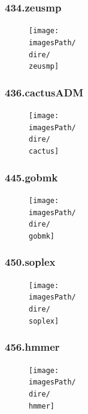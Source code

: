 \documentclass[12pt,a4paper]{article}
\newcommand{\imagesPath}{/home/nick/arch-ntua/ex02/graphs}
\newcommand{\zeusmp}{434.zeusmp.cslab_branch_predictors.out.pdf}
\newcommand{\cactus}{436.cactusADM.cslab_branch_predictors.out.pdf}
\newcommand{\gobmk}{445.gobmk.cslab_branch_predictors.out.pdf}
\newcommand{\soplex}{450.soplex.cslab_branch_predictors.out.pdf}
\newcommand{\hmmer}{456.hmmer.cslab_branch_predictors.out.pdf}
\newcommand{\dire}{4.5}
\begin{document}
		\subsubsection{434.zeusmp}
			\begin{figure}[H]
				\begin{center}
					 \texttt{[image: \\imagesPath/\\dire/\\zeusmp]}
				\end{center}
			\end{figure}
		
		\subsubsection{436.cactusADM}
			\begin{figure}[H]
				\begin{center}
					 \texttt{[image: \\imagesPath/\\dire/\\cactus]}
				\end{center}
			\end{figure}
		
		\subsubsection{445.gobmk}
			\begin{figure}[H]
				\begin{center}
					 \texttt{[image: \\imagesPath/\\dire/\\gobmk]}
				\end{center}
			\end{figure}
		
		\subsubsection{450.soplex}
			\begin{figure}[H]
				\begin{center}
					 \texttt{[image: \\imagesPath/\\dire/\\soplex]}
				\end{center}
			\end{figure}
		
		\subsubsection{456.hmmer}
			\begin{figure}[H]
				\begin{center}
					 \texttt{[image: \\imagesPath/\\dire/\\hmmer]}
				\end{center}
			\end{figure}
		
\end{document}
